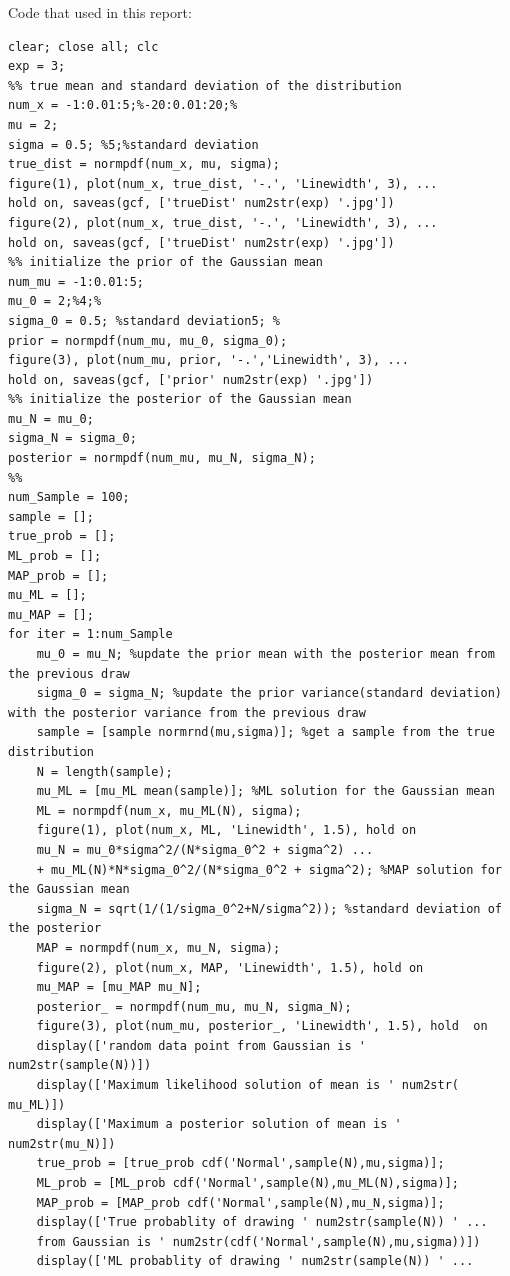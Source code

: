 \documentclass[a4paper]{article}
\begin{document}
\begin{spacing}{2.0}
\begin{itemize}
\newpage
Code that used in this report:
\begin{lstlisting}
clear; close all; clc
exp = 3;
%% true mean and standard deviation of the distribution
num_x = -1:0.01:5;%-20:0.01:20;%
mu = 2;
sigma = 0.5; %5;%standard deviation 
true_dist = normpdf(num_x, mu, sigma);
figure(1), plot(num_x, true_dist, '-.', 'Linewidth', 3), ...
hold on, saveas(gcf, ['trueDist' num2str(exp) '.jpg'])
figure(2), plot(num_x, true_dist, '-.', 'Linewidth', 3), ...
hold on, saveas(gcf, ['trueDist' num2str(exp) '.jpg'])
%% initialize the prior of the Gaussian mean
num_mu = -1:0.01:5;
mu_0 = 2;%4;%
sigma_0 = 0.5; %standard deviation5; %
prior = normpdf(num_mu, mu_0, sigma_0);
figure(3), plot(num_mu, prior, '-.','Linewidth', 3), ...
hold on, saveas(gcf, ['prior' num2str(exp) '.jpg'])
%% initialize the posterior of the Gaussian mean
mu_N = mu_0;
sigma_N = sigma_0;
posterior = normpdf(num_mu, mu_N, sigma_N);
%%
num_Sample = 100;
sample = [];
true_prob = [];
ML_prob = [];
MAP_prob = [];
mu_ML = [];
mu_MAP = [];
for iter = 1:num_Sample
    mu_0 = mu_N; %update the prior mean with the posterior mean from the previous draw
    sigma_0 = sigma_N; %update the prior variance(standard deviation) with the posterior variance from the previous draw
    sample = [sample normrnd(mu,sigma)]; %get a sample from the true distribution
    N = length(sample);
    mu_ML = [mu_ML mean(sample)]; %ML solution for the Gaussian mean
    ML = normpdf(num_x, mu_ML(N), sigma);
    figure(1), plot(num_x, ML, 'Linewidth', 1.5), hold on 
    mu_N = mu_0*sigma^2/(N*sigma_0^2 + sigma^2) ...
    + mu_ML(N)*N*sigma_0^2/(N*sigma_0^2 + sigma^2); %MAP solution for the Gaussian mean
    sigma_N = sqrt(1/(1/sigma_0^2+N/sigma^2)); %standard deviation of the posterior
    MAP = normpdf(num_x, mu_N, sigma);
    figure(2), plot(num_x, MAP, 'Linewidth', 1.5), hold on
    mu_MAP = [mu_MAP mu_N];
    posterior_ = normpdf(num_mu, mu_N, sigma_N);
    figure(3), plot(num_mu, posterior_, 'Linewidth', 1.5), hold  on 
    display(['random data point from Gaussian is ' num2str(sample(N))])
    display(['Maximum likelihood solution of mean is ' num2str( mu_ML)])
    display(['Maximum a posterior solution of mean is ' num2str(mu_N)])
    true_prob = [true_prob cdf('Normal',sample(N),mu,sigma)];
    ML_prob = [ML_prob cdf('Normal',sample(N),mu_ML(N),sigma)];
    MAP_prob = [MAP_prob cdf('Normal',sample(N),mu_N,sigma)];
    display(['True probablity of drawing ' num2str(sample(N)) ' ...
    from Gaussian is ' num2str(cdf('Normal',sample(N),mu,sigma))])
    display(['ML probablity of drawing ' num2str(sample(N)) ' ...

\end{lstlisting}
\end{itemize}
\end{spacing}
\end{document}
